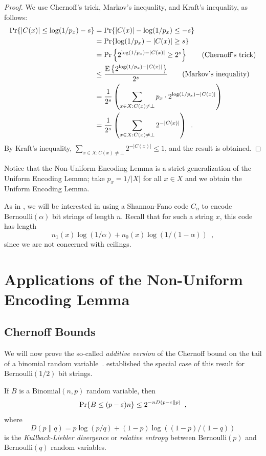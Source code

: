 \documentclass{patmorin}
\begin{document}
\begin{proof}
  We use Chernoff's trick, Markov's inequality, and Kraft's
  inequality, as follows:
  \begin{align*}
    \Pr\{ |C(x)| \le\log(1/p_x)-s \}
    & = \Pr\{|C(x)| -\log(1/p_x) \le -s \} \\
    & = \Pr\{\log(1/p_x)-|C(x)| \ge s \} \\
    & = \Pr\left\{2^{\log(1/p_x)-|C(x)|} \ge 2^s \right\}  \tag{Chernoff's trick} \\
    & \le \frac{\operatorname{\mathrm{E}}\left\{2^{\log(1/p_x)-|C(x)|}\right\}}{2^s} \tag{Markov's inequality} \\
    & = \frac{1}{2^s} \left(\sum_{x\in X : C(x) \neq \bot} p_x\cdot 2^{\log(1/p_x)-|C(x)|}\right) \\
    & = \frac{1}{2^s} \left(\sum_{x\in X : C(x) \neq \bot }2^{-|C(x)|}\right) \enspace .
  \end{align*}
  By Kraft's inequality,
  $\sum_{x \in X : C(x) \neq \bot} 2^{-|C(x)|} \leq 1$, and the result
  is obtained.
\end{proof}

Notice that the Non-Uniform Encoding Lemma is a strict generalization
of the Uniform Encoding Lemma; take $p_x=1/|X|$ for all $x\in X$ and
we obtain the Uniform Encoding Lemma.

As in , we will be interested in using a
Shannon-Fano code $C_\alpha$ to encode $\mathrm{Bernoulli}(\alpha)$
bit strings of length $n$. Recall that for such a string $x$, this
code has length
\[
  n_1(x) \log (1/\alpha) + n_0(x) \log(1/(1 - \alpha)) \enspace ,
\]
since we are not concerned with ceilings.

\section{Applications of the Non-Uniform Encoding Lemma}

\subsection{Chernoff Bounds}

We will now prove the so-called \emph{additive version} of the
Chernoff bound on the tail of a binomial random
variable~\cite{chernoff:bound}.  established
the special case of this result for $\mathrm{Bernoulli}(1/2)$ bit
strings.

\begin{thm}
  If $B$ is a $\mathrm{Binomial}(n,p)$ random variable, then
  \[
    \Pr\{B\le(p-\varepsilon)n\} \le 2^{-nD(p-\varepsilon \| p)} \enspace ,
  \]
  where 
  \[ 
    D(p \| q)= p\log (p/q) + (1-p)\log ((1 - p)/(1 - q))
  \]
  is the \emph{Kullback-Liebler divergence} or \emph{relative entropy}
  between $\mathrm{Bernoulli}(p)$ and $\mathrm{Bernoulli}(q)$ random
  variables.
\end{thm}
\end{document}
